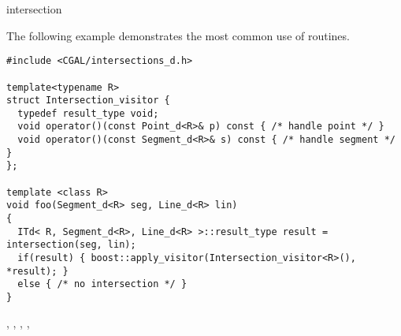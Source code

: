 \begin{ccRefFunction}{intersection}
\ccExample

The following example demonstrates the most common use of 
 routines.
\ccHtmlLinksOff%
\begin{verbatim}
#include <CGAL/intersections_d.h>

template<typename R>
struct Intersection_visitor {
  typedef result_type void;
  void operator()(const Point_d<R>& p) const { /* handle point */ }
  void operator()(const Segment_d<R>& s) const { /* handle segment */ }
};

template <class R>
void foo(Segment_d<R> seg, Line_d<R> lin)
{
  ITd< R, Segment_d<R>, Line_d<R> >::result_type result = intersection(seg, lin);
  if(result) { boost::apply_visitor(Intersection_visitor<R>(), *result); } 
  else { /* no intersection */ }
}
\end{verbatim}%
\ccHtmlLinksOn%

\ccSeeAlso {},  ,
, ,

\end{ccRefFunction}
